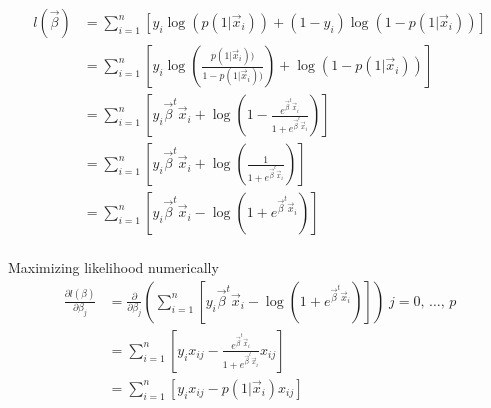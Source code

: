 \begin{align*}
l(\vec{\beta}) 
&=\sum_{i=1}^{n}[y_i\log(p(1|\vec{x}_i))+(1-y_i)\log(1-p(1|\vec{x}_i))]\\
&=\sum_{i=1}^{n}\left[y_i\log\left(\frac{p(1|\vec{x}_i))}{1-p(1|\vec{x}_i))}\right)+\log(1-p(1|\vec{x}_i))\right]\\
&=\sum_{i=1}^{n}\left[y_i\vec{\beta}^t\vec{x}_i+\log\left(1-\frac{e^{\vec{\beta}^t\vec{x}_i}}{1+e^{\vec{\beta}^t\vec{x}_i}}\right)\right]\\
&=\sum_{i=1}^{n}\left[y_i\vec{\beta}^t\vec{x}_i+\log\left(\frac{1}{1+e^{\vec{\beta}^t\vec{x}_i}}\right)\right]\\
&=\sum_{i=1}^{n}\left[y_i\vec{\beta}^t\vec{x}_i-\log\left(1+e^{\vec{\beta}^t\vec{x}_i}\right)\right]\\
\end{align*}

Maximizing likelihood numerically
\begin{align*}
\frac{\partial l(\beta)}{\partial \beta_j}
&=\frac{\partial}{\partial \beta_j}\left(\sum_{i=1}^{n}\left[y_i\vec{\beta}^t\vec{x}_i-\log\left(1+e^{\vec{\beta}^t\vec{x}_i}\right)\right]\right) \; j = 0,\,\dots,\,p \\
&=\sum_{i=1}^{n}\left[y_ix_{ij}-\frac{e^{\vec{\beta}^t\vec{x}_i}}{1+e^{\vec{\beta}^t\vec{x}_i}}x_{ij}\right]\\
&=\sum_{i=1}^{n}\left[y_ix_{ij}-p(1|\vec{x}_i)x_{ij}\right]\\
\end{align*}
